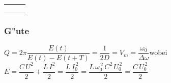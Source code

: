 \begin{tabular}{|p{4cm}|p{7cm}|p{7cm}|}
\begin{minipage}[]{7cm}
\vspace{0.1cm}
$D=\dfrac{R_S}{2}\sqrt{\dfrac{C}{L}}$\\
\end{minipage} &
\begin{minipage}[]{7cm}
\vspace{0.2cm}
$D=\dfrac{1}{2\,R_P}\sqrt{\dfrac{L}{C}}$\\
\end{minipage}\\
\hline
\end{tabular}

\subsubsection{G"ute}
$Q=2\pi\dfrac{E(t)}{E(t)-E(t+T)}=\dfrac{1}{2D}=V_m=\dfrac{\omega_0}{\Delta \omega}$\quad wobei \quad $E=\dfrac{C\,U^2}{2}+\dfrac{L\,I^2}{2}=\dfrac{L\,I_0^{\,2}}{2}=\dfrac{L\,\omega_0^{\,2}\,C^2\,U_0^{\,2}}{2}=\dfrac{C\,U_0^{\,2}}{2}$
